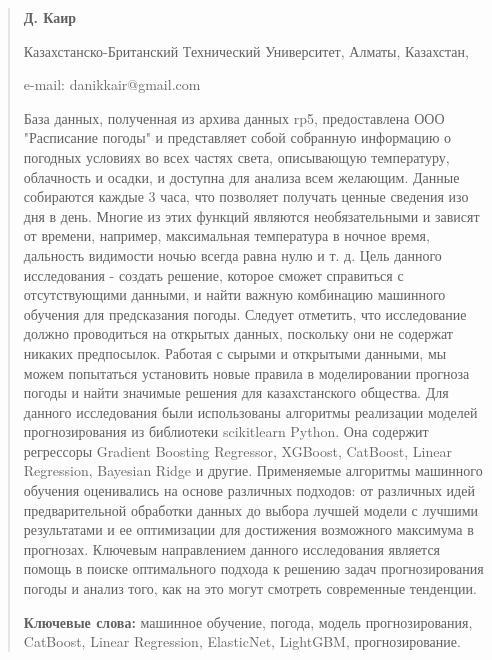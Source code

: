 \begin{quote}
\textbf{Д. Каир}

Казахстанско-Британский Технический Университет, Алматы, Казахстан,

e-mail: danikkair@gmail.com

База данных, полученная из архива данных rp5, предоставлена ООО
"Расписание погоды" и представляет собой собранную информацию о погодных
условиях во всех частях света, описывающую температуру, облачность и
осадки, и доступна для анализа всем желающим. Данные собираются каждые 3
часа, что позволяет получать ценные сведения изо дня в день. Многие из
этих функций являются необязательными и зависят от времени, например,
максимальная температура в ночное время, дальность видимости ночью
всегда равна нулю и т. д. Цель данного исследования - создать решение,
которое сможет справиться с отсутствующими данными, и найти важную
комбинацию машинного обучения для предсказания погоды. Следует отметить,
что исследование должно проводиться на открытых данных, поскольку они не
содержат никаких предпосылок. Работая с сырыми и открытыми данными, мы
можем попытаться установить новые правила в моделировании прогноза
погоды и найти значимые решения для казахстанского общества. Для данного
исследования были использованы алгоритмы реализации моделей
прогнозирования из библиотеки scikitlearn Python. Она содержит
регрессоры Gradient Boosting Regressor, XGBoost, CatBoost, Linear
Regression, Bayesian Ridge и другие. Применяемые алгоритмы машинного
обучения оценивались на основе различных подходов: от различных идей
предварительной обработки данных до выбора лучшей модели с лучшими
результатами и ее оптимизации для достижения возможного максимума в
прогнозах. Ключевым направлением данного исследования является помощь в
поиске оптимального подхода к решению задач прогнозирования погоды и
анализ того, как на это могут смотреть современные тенденции.

\textbf{Ключевые слова:} машинное обучение, погода, модель
прогнозирования, CatBoost, Linear Regression, ElasticNet, LightGBM,
прогнозирование.


\end{quote}
